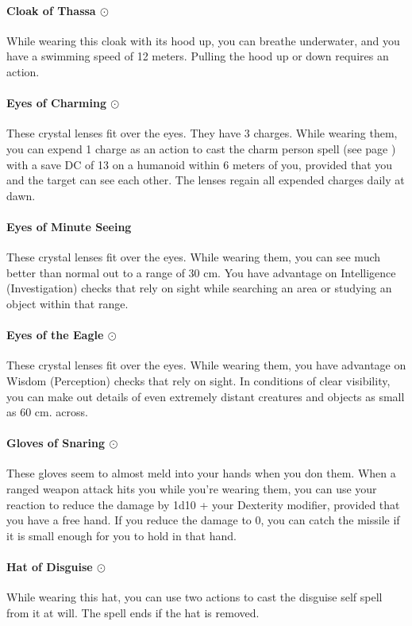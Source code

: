     \paragraph{Cloak of Thassa $\odot$}
        While wearing this cloak with its hood up, you can breathe underwater, and you have a swimming speed of 12 meters.
        Pulling the hood up or down requires an action.
    \paragraph{Eyes of Charming $\odot$}
        These crystal lenses fit over the eyes.
        They have 3 charges.
        While wearing them, you can expend 1 charge as an action to cast the charm person spell (see page \pageref{spell::charmperson}) with a save DC of 13 on a humanoid within 6 meters of you, provided that you and the target can see each other.
        The lenses regain all expended charges daily at dawn.
    \paragraph{Eyes of Minute Seeing}
        These crystal lenses fit over the eyes.
        While wearing them, you can see much better than normal out to a range of 30 cm.
        You have advantage on Intelligence (Investigation) checks that rely on sight while searching an area or studying an object within that range.
    \paragraph{Eyes of the Eagle $\odot$}
        These crystal lenses fit over the eyes.
        While wearing them, you have advantage on Wisdom (Perception) checks that rely on sight.
        In conditions of clear visibility, you can make out details of even extremely distant creatures and objects as small as 60 cm. across.
    \paragraph{Gloves of Snaring $\odot$}
        These gloves seem to almost meld into your hands when you don them.
        When a ranged weapon attack hits you while you're wearing them, you can use your reaction to reduce the damage by 1d10 + your Dexterity modifier, provided that you have a free hand.
        If you reduce the damage to 0, you can catch the missile if it is small enough for you to hold in that hand.
    \paragraph{Hat of Disguise $\odot$}
        While wearing this hat, you can use two actions to cast the disguise self spell from it at will.
        The spell ends if the hat is removed.
